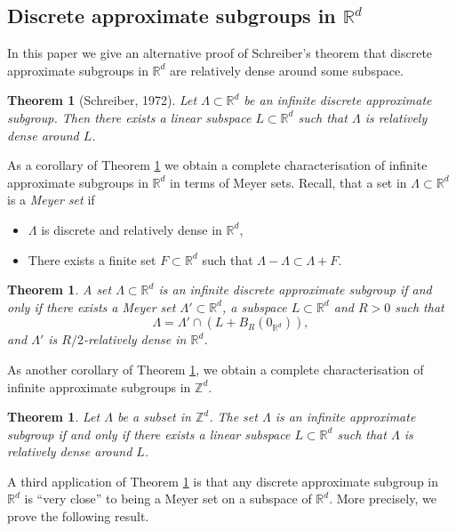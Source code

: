 \documentclass[10pt]{amsart}
\newcommand{\bR}{\mathbb{R}}
\newcommand{\bZ}{\mathbb{Z}}
\newcounter{dummy} \numberwithin{dummy}{section}
\theoremstyle{plain}
\newtheorem{thm}[dummy]{Theorem}
\theoremstyle{definition}
\begin{document}
\subsection{Discrete approximate subgroups in $\bR^d$}

In this paper we give an alternative proof of Schreiber's theorem \cite{S} that discrete approximate subgroups in $\bR^d$ are relatively dense around some subspace.

\begin{thm}[Schreiber, 1972]\label{main-thm}
Let $\Lambda \subset \bR^d$ be an infinite discrete approximate subgroup. Then there exists a linear subspace $L \subset \bR^d$ such that $\Lambda$ is relatively dense around $L$.
\end{thm}

As a corollary of Theorem \ref{main-thm} we obtain a complete characterisation of infinite approximate subgroups in $\bR^d$ in terms of Meyer sets. Recall, that a set in $\Lambda \subset \bR^d$ is a \textit{Meyer set} if
\begin{itemize}
\item $\Lambda$ is discrete and relatively dense in $\bR^d$,
\item There exists a finite set $F \subset \bR^d$ such that $\Lambda - \Lambda \subset \Lambda + F$.
\end{itemize}

\begin{thm}\label{complete-classification}
A set $\Lambda \subset \bR^d$ is an infinite discrete approximate subgroup if and only if there exists a Meyer set $\Lambda' \subset \bR^d$, a subspace $L \subset \bR^d$ and $R > 0$ such that\vspace*{-3pt}
\[
\Lambda = \Lambda' \cap \left( L + B_R(0_{\bR^d})\right),
\]
and $\Lambda'$ is $R/2$-relatively dense in $\bR^d$.

\end{thm}
As another corollary of Theorem \ref{main-thm}, we obtain a complete characterisation of infinite approximate subgroups in $\bZ^d$.

\begin{thm}\label{cor}
Let $\Lambda$ be a subset in $\bZ^d$. The set $\Lambda$ is an infinite approximate subgroup if and only if there exists a linear subspace $L \subset \bR^d$ such that $\Lambda$ is relatively dense around $L$.
\end{thm}

A third application of Theorem \ref{main-thm} is that any discrete approximate subgroup in~$\bR^d$ is ``very close'' to being a Meyer set on a subspace of $\bR^d$. More precisely, we prove the following result.
\end{document}
